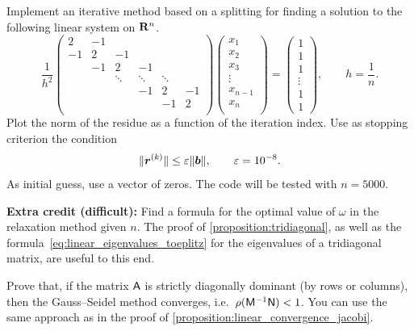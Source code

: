 \begin{compexercise}
    Implement an iterative method based on a splitting for finding a solution to the following linear system on $\mathbf R^n$.
    \[
        \frac{1}{h^2}
        \begin{pmatrix}
            2 & -1 \\
            -1 & 2  & -1 \\
               & -1 & 2      & -1 \\
               &    & \ddots & \ddots & \ddots & \\
               &    &        & -1    & 2      & -1 \\
               &    &        &     & -1      & 2 \\
        \end{pmatrix}
        \begin{pmatrix}
            x_1 \\
            x_2 \\
            x_3 \\
            \vdots \\
            x_{n-1} \\
            x_n \\
        \end{pmatrix}
        =
        \begin{pmatrix}
            1 \\
            1 \\
            1 \\
            \vdots \\
            1 \\
            1
        \end{pmatrix},
        \qquad
        h = \frac{1}{n}.
    \]
    Plot the norm of the residue as a function of the iteration index.
    Use as stopping criterion the condition
    \[
        \lVert\mathbf{\boldsymbol{r}}^{(k)}\rVert \leq \varepsilon \lVert\mathbf{\boldsymbol{b}}\rVert,
        \qquad \varepsilon = 10^{-8}.
    \]
    As initial guess, use a vector of zeros.
    The code will be tested with $n = 5000$.

    \vspace{.2cm}
    \noindent \textbf{Extra credit (difficult):} Find a formula for the optimal value of $\omega$ in the relaxation method given $n$.
    The proof of \cref{proposition:tridiagonal},
    as well as the formula~\eqref{eq:linear_eigenvalues_toeplitz} for the eigenvalues of a tridiagonal matrix,
    are useful to this end.
\end{compexercise}

\begin{exercise}
    \label{exercise:linear_convergence_gauss_seidel}
    Prove that, if the matrix $\mathsf A$ is strictly diagonally dominant (by rows or columns),
    then the Gauss--Seidel method converges, i.e.\ $\rho(\mathsf M^{-1} \mathsf N) < 1$.
    You can use the same approach as in the proof of \cref{proposition:linear_convergence_jacobi}.
\end{exercise}
